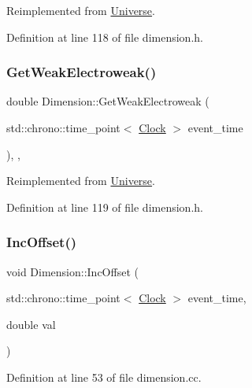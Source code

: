 Reimplemented from \hyperlink{class_universe_a4476b7e0a3fc1764909f556257fd9ec7}{Universe}.



Definition at line 118 of file dimension.\+h.

\mbox{\label{class_dimension_a5bb5a164564013a60728854cc2e5ddb3}} 
\subsubsection{\texorpdfstring{Get\+Weak\+Electroweak()}{GetWeakElectroweak()}}
{\footnotesize\ttfamily double Dimension\+::\+Get\+Weak\+Electroweak (\begin{DoxyParamCaption}\item[{std\+::chrono\+::time\+\_\+point$<$ \hyperlink{universe_8h_a0ef8d951d1ca5ab3cfaf7ab4c7a6fd80}{Clock} $>$}]{event\+\_\+time }\end{DoxyParamCaption})\hspace{0.3cm}{\ttfamily [inline]}, {\ttfamily [final]}, {\ttfamily [virtual]}}



Reimplemented from \hyperlink{class_universe_a645299738e6b798a037f2a15a2e7cf4d}{Universe}.



Definition at line 119 of file dimension.\+h.

\mbox{\label{class_dimension_aaf18cc220562b30f9e7aee92f16cc08e}} 
\subsubsection{\texorpdfstring{Inc\+Offset()}{IncOffset()}}
{\footnotesize\ttfamily void Dimension\+::\+Inc\+Offset (\begin{DoxyParamCaption}\item[{std\+::chrono\+::time\+\_\+point$<$ \hyperlink{universe_8h_a0ef8d951d1ca5ab3cfaf7ab4c7a6fd80}{Clock} $>$}]{event\+\_\+time,  }\item[{double}]{val }\end{DoxyParamCaption})}



Definition at line 53 of file dimension.\+cc.

